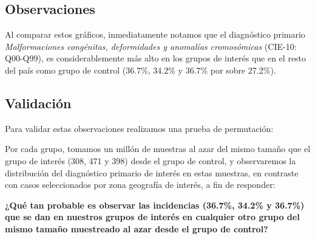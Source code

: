 \documentclass[]{article}
\begin{document}
\hypertarget{observaciones}{%
\subsection{Observaciones}\label{observaciones}}

Al comparar estos gráficos, inmediatamente notamos que el diagnóstico
primario \emph{Malformaciones congénitas, deformidades y anomalías
cromosómicas} (CIE-10: Q00-Q99), es considerablemente más alto en los
grupos de interés que en el resto del país como grupo de control
(36.7\%, 34.2\% y 36.7\% por sobre 27.2\%).

\hypertarget{validaciuxf3n}{%
\subsection{Validación}\label{validaciuxf3n}}

Para validar estas observaciones realizamos una prueba de permutación:

Por cada grupo, tomamos un millón de muestras al azar del mismo tamaño que el
grupo de interés (308, 471 y 398) desde el grupo de control, y
observaremos la distribución del diagnóstico primario de interés en
estas muestras, en contraste con casos seleccionados por zona geografía de interés, a fin de responder:

\textbf{¿Qué tan probable es observar las incidencias (36.7\%, 34.2\% y
36.7\%) que se dan en nuestros grupos de interés en cualquier otro grupo
del mismo tamaño muestreado al azar desde el grupo de control?}
\end{document}
